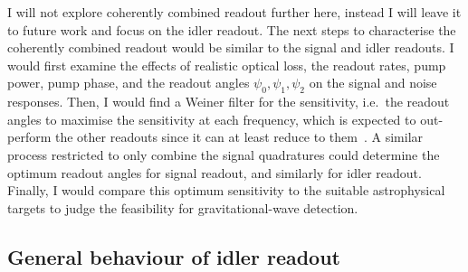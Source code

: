 
I will not explore coherently combined readout further here, instead I will leave it to future work and focus on the idler readout. The next steps to characterise the coherently combined readout would be similar to the signal and idler readouts. I would first examine the effects of realistic optical loss, the readout rates, pump power, pump phase, and the readout angles $\psi_0,\psi_1,\psi_2$ on the signal and noise responses. %
Then, I would find a Weiner filter for the sensitivity, i.e.\ the readout angles to maximise the sensitivity at each frequency, which is expected to out-perform the other readouts since it can at least reduce to them~\cite{}. A similar process restricted to only combine the signal quadratures could determine the optimum readout angles for signal readout, and similarly for idler readout. Finally, I would compare this optimum sensitivity to the suitable astrophysical targets to judge the feasibility for gravitational-wave detection.


\subsection{General behaviour of idler readout}
\label{sec:nIS_general_behaviour_idler}

